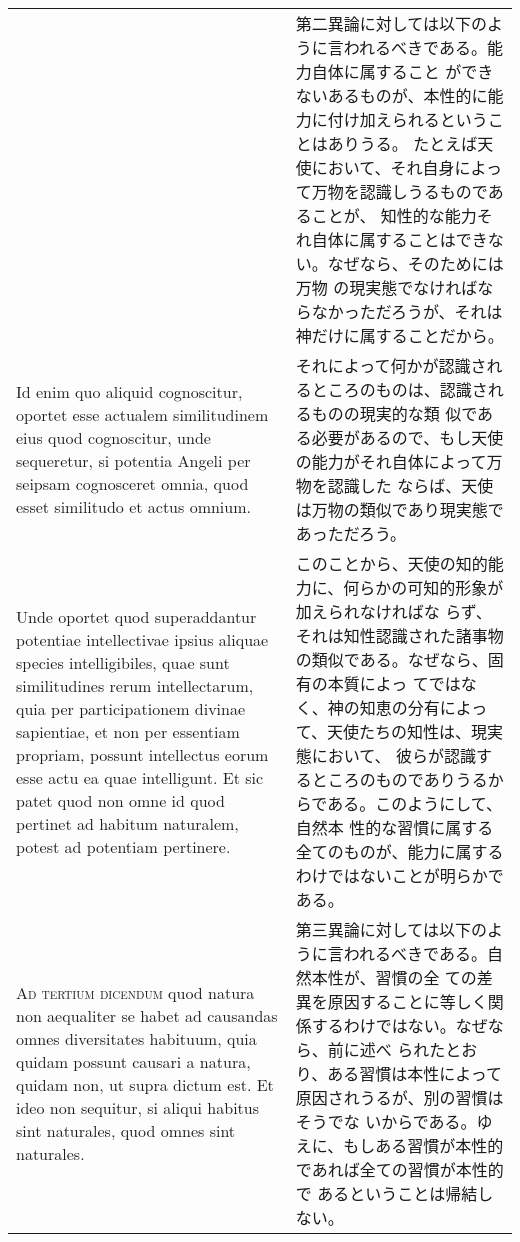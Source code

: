 \documentclass[10pt]{jsarticle} %
\begin{document}
\begin{longtable}{p{21em}p{21em}}
&

第二異論に対しては以下のように言われるべきである。能力自体に属すること
ができないあるものが、本性的に能力に付け加えられるということはありうる。
たとえば天使において、それ自身によって万物を認識しうるものであることが、
知性的な能力それ自体に属することはできない。なぜなら、そのためには万物
の現実態でなければならなかっただろうが、それは神だけに属することだから。

\\



Id enim quo aliquid cognoscitur, oportet esse actualem similitudinem
eius quod cognoscitur, unde sequeretur, si potentia Angeli per seipsam
cognosceret omnia, quod esset similitudo et actus omnium.

&

それによって何かが認識されるところのものは、認識されるものの現実的な類
似である必要があるので、もし天使の能力がそれ自体によって万物を認識した
ならば、天使は万物の類似であり現実態であっただろう。

\\


Unde oportet quod superaddantur potentiae intellectivae ipsius aliquae
species intelligibiles, quae sunt similitudines rerum intellectarum,
quia per participationem divinae sapientiae, et non per essentiam
propriam, possunt intellectus eorum esse actu ea quae intelligunt. Et
sic patet quod non omne id quod pertinet ad habitum naturalem, potest
ad potentiam pertinere.

&

このことから、天使の知的能力に、何らかの可知的形象が加えられなければな
らず、それは知性認識された諸事物の類似である。なぜなら、固有の本質によっ
てではなく、神の知恵の分有によって、天使たちの知性は、現実態において、
彼らが認識するところのものでありうるからである。このようにして、自然本
性的な習慣に属する全てのものが、能力に属するわけではないことが明らかで
ある。

\\





{\scshape Ad tertium dicendum} quod natura non aequaliter se habet ad
causandas omnes diversitates habituum, quia quidam possunt causari a
natura, quidam non, ut supra dictum est. Et ideo non sequitur, si
aliqui habitus sint naturales, quod omnes sint naturales.

&

第三異論に対しては以下のように言われるべきである。自然本性が、習慣の全
ての差異を原因することに等しく関係するわけではない。なぜなら、前に述べ
られたとおり、ある習慣は本性によって原因されうるが、別の習慣はそうでな
いからである。ゆえに、もしある習慣が本性的であれば全ての習慣が本性的で
あるということは帰結しない。

\end{longtable}
\newpage
\end{document}
